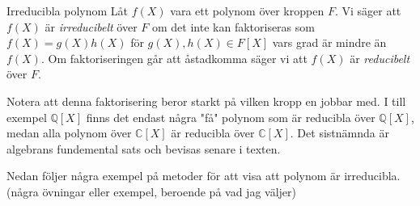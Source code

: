 \documentclass{article}
\theoremstyle{definition}
\begin{document}
\begin{mydef}{Irreducibla polynom}{}
  Låt $f(X)$ vara ett polynom över kroppen $F$. Vi säger att $f(X)$ är \textit{irreducibelt} över $F$ om det inte kan faktoriseras som $f(X) = g(X)h(X)$
  för $g(X), h(X) \in F[X]$ vars grad är mindre än $f(X)$. Om faktoriseringen går att åstadkomma säger vi att $f(X)$ är \textit{reducibelt} över $F.$
\end{mydef}
Notera att denna faktorisering beror starkt på vilken kropp en jobbar med. I till exempel $\mathbb{Q}[X]$ finns det endast några "få" polynom som är reducibla
över $\mathbb{Q}[X]$, medan alla polynom över $\mathbb{C}[X]$ är reducibla över $\mathbb{C}[X]$. Det sistnämnda är algebrans fundemental sats och 
bevisas senare i texten.

Nedan följer några exempel på metoder för att visa att polynom är irreducibla. 
(några övningar eller exempel, beroende på vad jag väljer)
\end{document}
